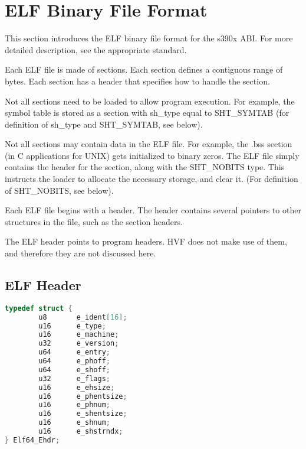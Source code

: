 \section{ELF Binary File Format}
\label{sec:elf}
This section introduces the ELF binary file format for the s390x ABI.  For
more detailed description, see the appropriate standard.

\cbstart
Each ELF file is made of sections.  Each section defines a contiguous range
of bytes.  Each section has a header that specifies how to handle the
section.

Not all sections need to be loaded to allow program execution.  For example,
the symbol table is stored as a section with sh\_type equal to SHT\_SYMTAB
(for definition of sh\_type and SHT\_SYMTAB, see below).

Not all sections may contain data in the ELF file.  For example, the .bss
section (in C applications for UNIX) gets initialized to binary zeros.  The
ELF file simply contains the header for the section, along with the
SHT\_NOBITS type.  This instructs the loader to allocate the necessary
storage, and clear it.  (For definition of SHT\_NOBITS, see below).

Each ELF file begins with a header.  The header contains several pointers to
other structures in the file, such as the section headers.

The ELF header points to program headers.  HVF does not make use of them,
and therefore they are not discussed here.
\cbend

\cbstart
\subsection{ELF Header}
\cbend

\cbdelete
\begin{lstlisting}[language=C]
typedef struct {
        u8       e_ident[16];
        u16      e_type;
        u16      e_machine;
        u32      e_version;
        u64      e_entry;
        u64      e_phoff;
        u64      e_shoff;
        u32      e_flags;
        u16      e_ehsize;
        u16      e_phentsize;
        u16      e_phnum;
        u16      e_shentsize;
        u16      e_shnum;
        u16      e_shstrndx;
} Elf64_Ehdr;
\end{lstlisting}

